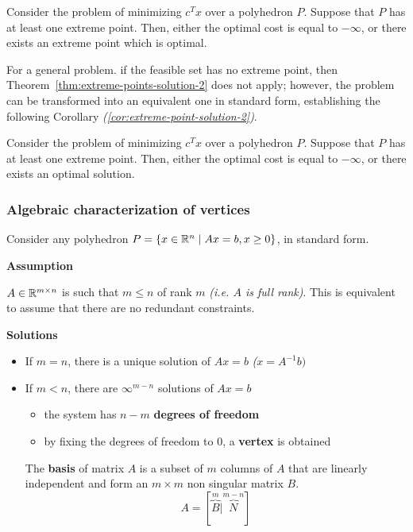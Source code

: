 \documentclass[english]{article}
\begin{document}
\bigskip
\begin{theorem}
  Consider the \LP problem of minimizing \(c^T x\) over a polyhedron \(P\).
  Suppose that \(P\) has at least one extreme point.
  Then, either the optimal cost is equal to \(-\infty\), or there exists an extreme point which is optimal.
  \label{thm:extreme-points-solution-2}
\end{theorem}

For a general \LP problem. if the feasible set has no extreme point, then Theorem~\ref{thm:extreme-points-solution-2} does not apply;
however, the problem can be transformed into an equivalent one in standard form, establishing the following Corollary \textit{(\ref{cor:extreme-point-solution-2})}.

\begin{corollary}
  Consider the \LP problem of minimizing \(c^T x\) over a polyhedron \(P\).
  Suppose that \(P\) has at least one extreme point.
  Then, either the optimal cost is equal to \(-\infty\), or there exists an optimal solution.
  \label{cor:extreme-point-solution-2}
\end{corollary}

\subsubsection{Algebraic characterization of vertices}

Consider any polyhedron \(P = \left\{ x \in \mathbb{R}^n \mid   Ax = b, x \geq 0 \right\}\), in standard form.

\bigskip
\textbf{Assumption}

\(A \in \mathbb{R}^{m \times n}\) is such that \(m \leq n\) of rank \(m\) \textit{(i.e. \(A\) is full rank)}.
This is equivalent to assume that there are no redundant constraints.

\bigskip
\textbf{Solutions}

\begin{itemize}
  \item If \(m = n\), there is a unique solution of \(Ax = b\) \textit{(\(x = A^{-1} b)\)}
  \item If \(m < n\), there are \(\infty^{m-n}\) solutions of \(Ax = b\)
        \begin{itemize}
          \item the system has \(n-m\) \textbf{degrees of freedom}
          \item by fixing the degrees of freedom to \(0\), a \textbf{vertex} is obtained
        \end{itemize}

        The \textbf{basis} of matrix \(A\) is a subset of \(m\) columns of \(A\) that are linearly independent and form an \(m \times m\) non singular matrix \(B\).
        \[ A = [ \overbrace{B}^m | \overbrace{N}^{m-n} ] \]
\end{itemize}
\end{document}
